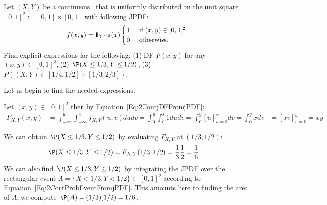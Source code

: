 \begin{example}\label{Eg:Unif2DPDFandCDF}
Let $(X,Y)$ be a continuous \rv~that is uniformly distributed on the unit square $[0,1]^2 := [0,1] \times [0,1]$ with following JPDF:
\[
f(x,y) =  {1}\mspace{-11 mu}{1}_{[0,1]^2}(x) 
\begin{cases}
1 & \text{ if } (x,y) \in [0,1]^2 \\
0 & \text{ otherwise}.
\end{cases}
\]
Find explicit expressions for the following: (1) DF $F(x,y)$ for any $(x,y) \in [0,1]^2$, (2) $\P(X \leq 1/3, Y \leq 1/2)$, (3) $P\left( (X,Y) \in [1/4,1/2]\times[1/3,2/3] \right)$.

\begin{center}
\end{center}

Let us begin to find the needed expressions.
\be
\item
Let $(x,y) \in [0,1]^2$ then by Equation~\eqref{Eq:2ContjDFFromjPDF}:
{\small
\begin{align*}
F_{X,Y}(x,y) 
&= \int_{-\infty}^{y} \int_{-\infty}^{x} f_{X,Y}(u,v) dudv
= \int_{0}^{y} \int_{0}^{{x}} 1 dudv
= \int_{0}^{y} \left[ u \right]_{u=0}^{x}  dv
= \int_{0}^{y} x  dv
&= \left[ x v \right]_{v=0}^{y}
= {x}{y}
\end{align*}
}
\item We can obtain $\P(X \leq 1/3, Y \leq 1/2)$ by evaluating $F_{X,Y}$ at $(1/3,1/2)$:
{\small
\begin{align*}
\P(X \leq 1/3, Y \leq 1/2)
&= F_{X,Y}(1/3,1/2)
= \frac{1}{3}\frac{1}{2}
= \frac{1}{6}
\end{align*}
}
We can also find $\P(X \leq 1/3, Y \leq 1/2)$ by integrating the JPDF over the rectangular event $A=\{X < 1/3, Y < 1/2 \} \subset [0,1]^2$ according to Equation~\eqref{Eq:2ContProbEventFromjPDF}.  
This amounts here to finding the area of $A$, we compute $\P(A) = (1/3) (1/2) = 1/6$.  


\end{example}
